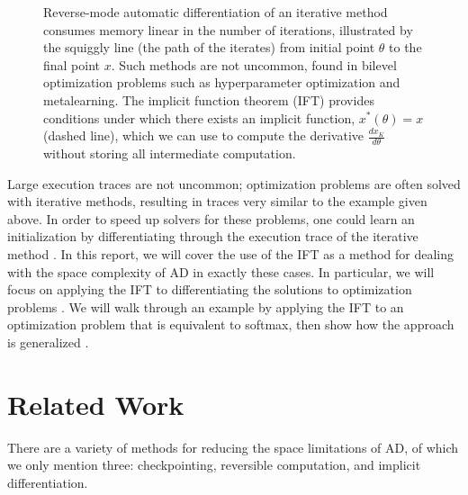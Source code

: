 \documentclass[11pt]{article}
\begin{document}
\begin{figure}
\centering
{}
\caption{
\label{fig:optift}
Reverse-mode automatic differentiation of an iterative method consumes memory
linear in the number of iterations,
illustrated by the squiggly line (the path of the iterates)
from initial point $\theta$ to the final point $x$.
Such methods are not uncommon, found in bilevel optimization problems such as
hyperparameter optimization and metalearning.
The implicit function theorem (IFT)
provides conditions under which there exists an implicit function,
$x^*(\theta) = x$ (dashed line), which we can use to compute the derivative
$\frac{dx_K}{d\theta}$ without storing all intermediate computation.
}
\end{figure}


Large execution traces are not uncommon;
optimization problems are often solved with iterative methods,
resulting in traces very similar to the example given above.
In order to speed up solvers for these problems,
one could learn an initialization by differentiating through the
execution trace of the iterative method \citep{finn2017maml,kim2018savi,neuralinit}.
In this report, we will cover the use of the IFT
as a method for dealing with the space complexity of AD in exactly these cases.
In particular,
we will focus on applying the IFT to differentiating the solutions to optimization problems
\citep{optnet,agrawal2019diffcvx}.
We will walk through an example by applying the IFT to an optimization problem
that is equivalent to softmax,
then show how the approach is generalized \citep{optnet}.

\section{Related Work}
There are a variety of methods for reducing the space limitations of AD,
of which we only mention three: checkpointing, reversible computation, and implicit differentiation.
\end{document}

